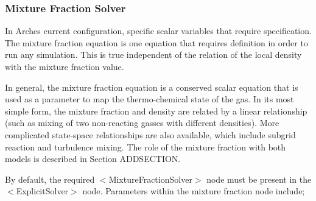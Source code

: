 \subsubsection{Mixture Fraction Solver}
In Arches current configuration, specific scalar variables that require specification.  The mixture fraction equation is one equation that requires definition in order to run any simulation.  This is true independent of the relation of the local density with the mixture fraction value.  

In general, the mixture fraction equation is a conserved scalar equation that is used as a parameter to map the thermo-chemical state of the gas.   In its most simple form, the mixture fraction and density are related by a linear relationship (such as mixing of two non-reacting gasses with different densities).  More complicated state-space relationships are also available, which include subgrid reaction and turbulence mixing.  The role of the mixture fraction with both models is described in Section ADDSECTION.  

By default, the required $<$MixtureFractionSolver$>$ node must be present in the $<$ExplicitSolver$>$ node.  Parameters within the mixture fraction node include; 

